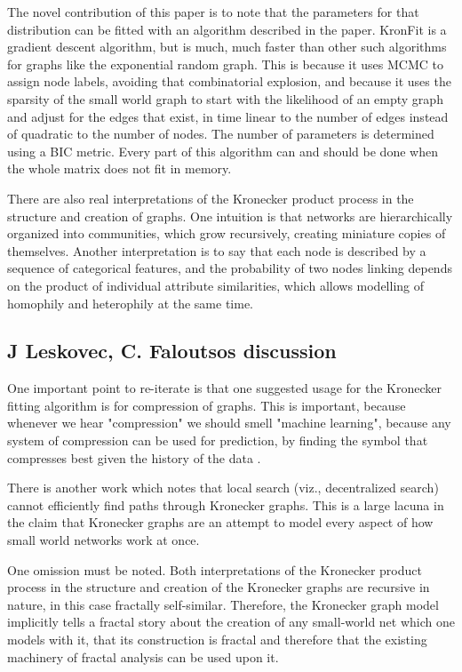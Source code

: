 \documentclass[12pt]{article}
\begin{document}
The novel contribution of this paper is to note that the parameters for that distribution can be fitted with an algorithm described in the paper. KronFit is a gradient descent algorithm, but is much, much faster than other such algorithms for graphs like the exponential random graph. This is because it uses MCMC to assign node labels, avoiding that combinatorial explosion, and because it uses the sparsity of the small world graph to start with the likelihood of an empty graph and adjust for the edges that exist, in time linear to the number of edges instead of quadratic to the number of nodes. The number of parameters is determined using a BIC metric. Every part of this algorithm can and should be done when the whole matrix does not fit in memory.

There are also real interpretations of the Kronecker product process in the structure and creation of graphs. One intuition is that networks are hierarchically organized into communities, which grow recursively, creating miniature copies of themselves. Another interpretation is to say that each node is described by a sequence of categorical features, and the probability of two nodes linking depends on the product of individual attribute similarities, which allows modelling of homophily and heterophily at the same time.

\subsection{J Leskovec, C. Faloutsos discussion}

One important point to re-iterate is that one suggested usage for the Kronecker fitting algorithm is for compression of graphs. This is important, because whenever we hear "compression" we should smell "machine learning", because any system of compression can be used for prediction, by finding the symbol that compresses best given the history of the data \cite{mlcompression}.

There is another work which notes that local search (viz., decentralized search) cannot efficiently find paths through Kronecker graphs. This is a large lacuna in the claim that Kronecker graphs are an attempt to model every aspect of how small world networks work at once\cite{stochkrongraph}.

One omission must be noted. Both interpretations of the Kronecker product process in the structure and creation of the Kronecker graphs are recursive in nature, in this case fractally self-similar. Therefore, the Kronecker graph model implicitly tells a fractal story about the creation of any small-world net which one models with it, that its construction is fractal and therefore that the existing machinery of fractal analysis can be used upon it.
\end{document}
